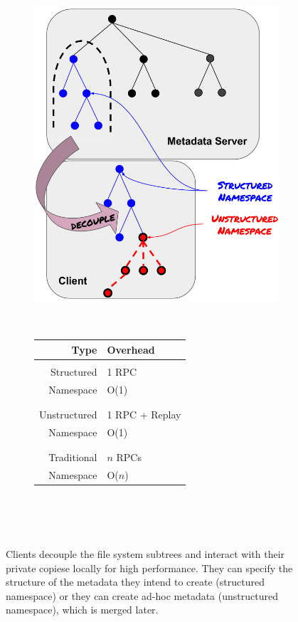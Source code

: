 \begin{figure}
  \centering
  \begin{subfigure}[b]{0.25\textwidth}
    \includegraphics[width=\textwidth]{figures/intro.png}
   \label{fig:intro}
  \end{subfigure}
  ~ 
  \begin{subfigure}[b]{0.3\textwidth}
    \begin{tabular}{ r | l }
      Type         & Overhead       \\\hline\\
      Structured   & 1 RPC          \\
      Namespace    & O(1)           \\\\\hdashline\\
      Unstructured & 1 RPC + Replay \\
      Namespace    & O(1)           \\\\\hdashline\\
      Traditional  & \(n\) RPCs     \\
      Namespace    & O(\(n\))       \\
    \end{tabular}
    \\\\\\ %
   \label{table:intro}
  \end{subfigure}
  \caption{Clients decouple the file system subtrees and interact with their
  private copiese locally for high performance. They can specify the structure of
  the metadata they intend to create (structured namespace) or they can create
  ad-hoc metadata (unstructured namespace), which is merged later.}
\end{figure}
